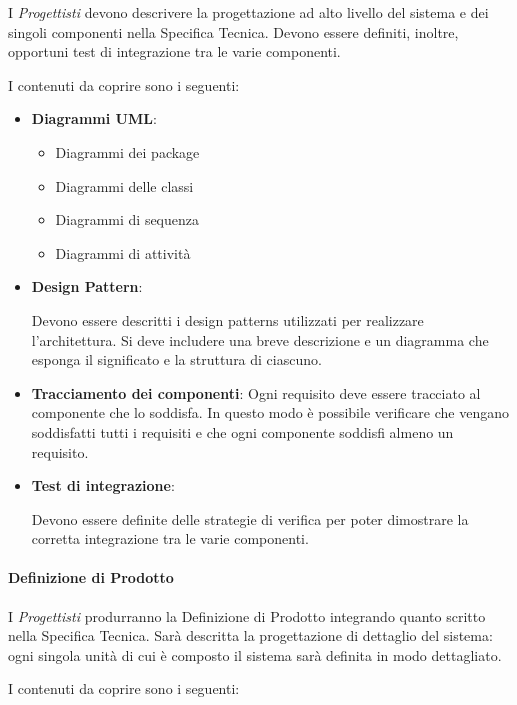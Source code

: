 I  \emph{Progettisti}  devono descrivere la progettazione ad alto livello del
sistema e dei singoli componenti nella Specifica Tecnica. Devono
essere definiti, inoltre, opportuni test di integrazione tra le varie
componenti.

I contenuti da coprire sono i seguenti:

\begin{itemize}
\item \textbf{Diagrammi UML}:
  \begin{itemize}
  \item Diagrammi dei package
  \item Diagrammi delle classi
  \item Diagrammi di sequenza
  \item Diagrammi di attività
  \end{itemize}
\item \textbf{Design Pattern}:

  Devono essere descritti i design patterns utilizzati per realizzare
  l'architettura. Si deve includere una breve descrizione e un
  diagramma che esponga il significato e la struttura di ciascuno. 

\item \textbf{Tracciamento dei componenti}:
  Ogni requisito deve essere tracciato al componente che lo
  soddisfa. In questo modo è possibile verificare che vengano
  soddisfatti tutti i requisiti e che ogni componente soddisfi almeno
  un requisito.  

\item \textbf{Test di integrazione}:

  Devono essere definite delle strategie di verifica per poter
  dimostrare la corretta integrazione tra le varie componenti. 
\end{itemize}

\paragraph{Definizione di Prodotto}

I  \emph{Progettisti}  produrranno la Definizione di Prodotto integrando quanto
scritto nella Specifica Tecnica. Sarà descritta la progettazione di
dettaglio del sistema: ogni singola unità di cui è composto il sistema
sarà definita in modo dettagliato. 

I contenuti da coprire sono i seguenti:

